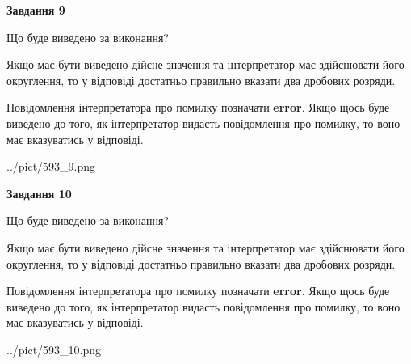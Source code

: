 \documentclass[12pt, ukrainian]{article}
\begin{document}
{\begin {Large}
{\begin {center}\textbf{Завдання 9}\end {center}}\par
Що буде виведено за виконання? \par

Якщо має бути виведено дійсне значення та інтерпретатор має здійснювати його округлення, 
то у відповіді достатньо правильно вказати два дробових розряди.

Повідомлення інтерпретатора про помилку позначати \textbf{error}.
Якщо щось буде виведено до того, як інтерпретатор видасть повідомлення про помилку, 
то воно має вказуватись у відповіді. \par

\begin{center}
	{../pict/593_9.png}
\end{center}
\newpage

{\begin {center}\textbf{Завдання 10}\end {center}}\par
Що буде виведено за виконання? \par

Якщо має бути виведено дійсне значення та інтерпретатор має здійснювати його округлення, 
то у відповіді достатньо правильно вказати два дробових розряди.

Повідомлення інтерпретатора про помилку позначати \textbf{error}.
Якщо щось буде виведено до того, як інтерпретатор видасть повідомлення про помилку, 
то воно має вказуватись у відповіді. \par

\begin{center}
	{../pict/593_10.png}
\end{center}
\newpage

\end {Large}}
\end{document}
